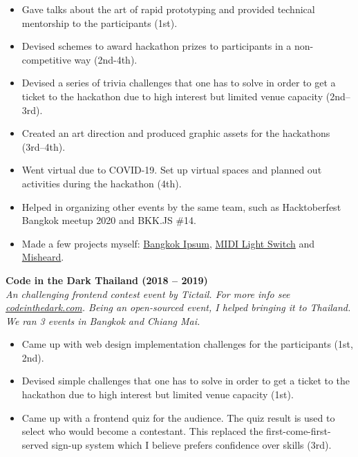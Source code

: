 \documentclass[a4paper]{article}
\begin{document}
\begin{itemize} \itemsep 1pt
    
	\item Gave talks about the art of rapid prototyping and provided technical mentorship to the participants (1st).
    
	\item Devised schemes to award hackathon prizes to participants in a non-competitive way (2nd-4th).
    
	\item Devised a series of trivia challenges that one has to solve in order to get a ticket to the hackathon due to high interest but limited venue capacity (2nd–3rd).
    
	\item Created an art direction and produced graphic assets for the hackathons (3rd–4th).
    
	\item Went virtual due to COVID-19. Set up virtual spaces and planned out activities during the hackathon (4th).
    
	\item Helped in organizing other events by the same team, such as Hacktoberfest Bangkok meetup 2020 and BKK.JS \#14.
    
	\item Made a few projects myself: \href{https://dt.in.th/bangkokipsum.html}{Bangkok Ipsum}, \href{https://dt.in.th/midi-light-switch.html}{MIDI Light Switch} and \href{https://www.youtube.com/watch?v=2JE3DETHTQo}{Misheard}.
    
\end{itemize}

\vspace{2mm}

\textbf{Code in the Dark Thailand (2018 – 2019)}\\
\textit{An challenging frontend contest event by Tictail. For more info see \href{http://codeinthedark.com/}{codeinthedark.com}. Being an open-sourced event, I helped bringing it to Thailand. We ran 3 events in Bangkok and Chiang Mai.}

\begin{itemize} \itemsep 1pt
    
	\item Came up with web design implementation challenges for the participants (1st, 2nd).
    
	\item Devised simple challenges that one has to solve in order to get a ticket to the hackathon due to high interest but limited venue capacity (1st).
    
	\item Came up with a frontend quiz for the audience. The quiz result is used to select who would become a contestant. This replaced the first-come-first-served sign-up system which I believe prefers confidence over skills (3rd).
    
\end{itemize}
\end{document}
